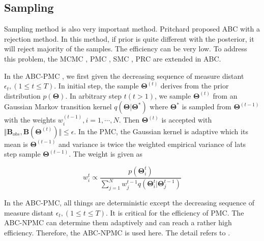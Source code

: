 \documentclass[review]{elsarticle}
\begin{document}
\subsection{Sampling}
Sampling method is also very important method. Pritchard \cite{pritchard1999population} proposed ABC with a rejection method. In this method, if prior is quite different with the posterior, it will reject majority of the samples. The efficiency can be very low. To address this problem, the MCMC \cite{marjoram2003markov}, PMC \cite{beaumont2009adaptive,beaumont2010approximate}, SMC \cite{toni2009approximate}, PRC \cite{sisson2007sequential} are extended in ABC. 

In the ABC-PMC \cite{beaumont2009adaptive,beaumont2010approximate}, we first given the decreasing sequence of measure distant $\epsilon_t, (1 \leq t \leq T)$. In initial step, the sample $\mathbf{\Theta}^{(t)}$ derives from the prior distribution $p(\mathbf{\Theta})$. In arbitrary step $t (t > 1)$, we sample $\mathbf{\Theta}^{(t)}$ from an Gaussian Markov transition kernel $q(\mathbf{\Theta} | \mathbf{\Theta}^*)$ where $\mathbf{\Theta}^*$ is sampled from $\mathbf{\Theta}^{(t-1)}$ with the weights $w_i^{(t-1)},i = 1,\cdots, N$. Then $\mathbf{\Theta}^{(t)}$ is accepted with $\Vert \mathbf{B}_{obs}, \mathbf{B}(\mathbf{\Theta}^{(t)}) \Vert \leq \epsilon$. In the PMC, the Gaussian kernel is adaptive which its mean is $\mathbf{\Theta}^{(t-1)}$ and variance is twice the weighted empirical variance of lats step sample $\mathbf{\Theta}^{(t-1)}$. The weight is given as

\begin{equation}
\label{eq:weight of PMC}
w_i^t \propto \frac{p(\mathbf{\Theta}_i^t)}{\sum_{j=1}^N w_j^{t-1} q(\mathbf{\Theta}_i^t | \mathbf{\Theta}_j^{t-1})}
\end{equation}

In the ABC-PMC, all things are deterministic except the decreasing sequence of measure distant $\epsilon_t, (1 \leq t \leq T)$. It is critical for the efficiency of PMC. The ABC-NPMC \cite{zeng2017} can determine them adaptively and can reach a rather high efficiency. Therefore, the ABC-NPMC is used here. The detail refers to  \cite{zeng2017}.
\end{document}
